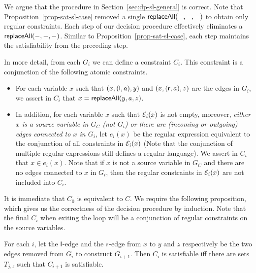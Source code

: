 We argue that the procedure in Section~\ref{sec:dp-sl-general} is correct.
Note that Proposition~\ref{prop-sat-sl-case} removed a single $\mathsf{replaceAll}(-,-,-)$ to obtain only regular constraints.
Each step of our decision procedure effectively eliminates a $\mathsf{replaceAll}(-,-,-)$.
Similar to Proposition~\ref{prop-sat-sl-case}, each step maintains the satisfiability from the preceding step.

In more detail, from each $G_i$ we can define a constraint $C_i$. This constraint is a conjunction of the following atomic constraints.
\begin{itemize}
\item For each variable $x$ such that $(x, (\mathsf{l}, a), y)$ and $(x, (\mathsf{r},a), z)$ are the edges in $G_i$, we assert in $C_i$ that $x = \mathsf{replaceAll}(y, a, z)$.
\item In addition, for each variable $x$ such that $\mathcal{E}_i(x)$ is not empty, moreover, \emph{either $x$ is a source variable in $G_C$ (not $G_i$) or there are (incoming or outgoing) edges connected to $x$ in $G_i$}, let $e_i(x)$ be the regular expression equivalent to the conjunction of all constraints in $\mathcal{E}_i(x)$ (Note that the conjunction of multiple regular expressions still defines a regular language). We assert in $C_i$ that $x \in e_i(x)$. Note that if $x$ is not a source variable in $G_C$ and there are no edges connected to $x$ in $G_i$, then the regular constraints in $\mathcal{E}_i(x)$ are not included into $C_i$.
\end{itemize}


It is immediate that $C_0$ is equivalent to $C$.
We require the following proposition, which gives us the correctness of the decision procedure by induction.
Note that the final $C_i$ when exiting the loop will be a conjunction of regular constraints on the source variables.

\begin{proposition}
    For each $i$,  let the $\mathsf{l}$-edge and the $\mathsf{r}$-edge from $x$ to $y$ and $z$ respectively be the two edges removed from $G_i$ to construct $G_{i+1}$. Then $C_i$ is satisfiable iff there are sets $T_{j, z}$ such that $C_{i+1}$ is satisfiable.
\end{proposition}

